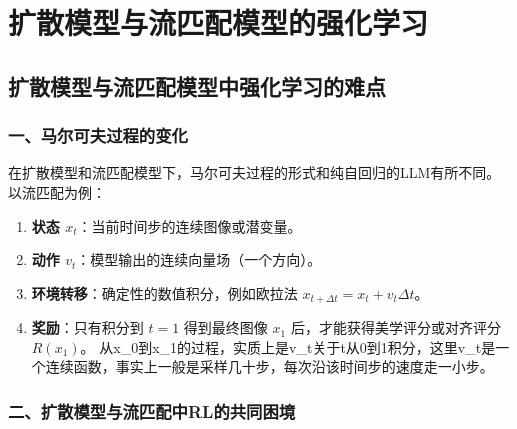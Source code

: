 \hypertarget{ux6269ux6563ux6a21ux578bux4e0eux6d41ux5339ux914dux6a21ux578bux7684ux5f3aux5316ux5b66ux4e60}{%
\chapter{扩散模型与流匹配模型的强化学习}\label{ux6269ux6563ux6a21ux578bux4e0eux6d41ux5339ux914dux6a21ux578bux7684ux5f3aux5316ux5b66ux4e60}}

\hypertarget{ux6269ux6563ux6a21ux578bux4e0eux6d41ux5339ux914dux6a21ux578bux4e2dux5f3aux5316ux5b66ux4e60ux7684ux96beux70b9}{%
\section{扩散模型与流匹配模型中强化学习的难点}\label{ux6269ux6563ux6a21ux578bux4e0eux6d41ux5339ux914dux6a21ux578bux4e2dux5f3aux5316ux5b66ux4e60ux7684ux96beux70b9}}

\hypertarget{ux4e00ux9a6cux5c14ux53efux592bux8fc7ux7a0bux7684ux53d8ux5316}{%
\subsection{一、马尔可夫过程的变化}\label{ux4e00ux9a6cux5c14ux53efux592bux8fc7ux7a0bux7684ux53d8ux5316}}

在扩散模型和流匹配模型下，马尔可夫过程的形式和纯自回归的LLM有所不同。以流匹配为例：

\begin{enumerate}
\def\labelenumi{\arabic{enumi}.}
\tightlist
\item
  \textbf{状态 \(x_t\)}：当前时间步的连续图像或潜变量。
\item
  \textbf{动作 \(v_t\)}：模型输出的连续向量场（一个方向）。
\item
  \textbf{环境转移}：确定性的数值积分，例如欧拉法 \(x_{t+\Delta t} = x_t + v_t \Delta t\)。
\item
  \textbf{奖励}：只有积分到 \(t = 1\) 得到最终图像 \(x_1\) 后，才能获得美学评分或对齐评分 \(R(x_1)\)。
  从x\_0到x\_1的过程，实质上是v\_t关于t从0到1积分，这里v\_t是一个连续函数，事实上一般是采样几十步，每次沿该时间步的速度走一小步。
\end{enumerate}

\hypertarget{ux4e8cux6269ux6563ux6a21ux578bux4e0eux6d41ux5339ux914dux4e2drlux7684ux5171ux540cux56f0ux5883}{%
\subsection{二、扩散模型与流匹配中RL的共同困境}\label{ux4e8cux6269ux6563ux6a21ux578bux4e0eux6d41ux5339ux914dux4e2drlux7684ux5171ux540cux56f0ux5883}}

